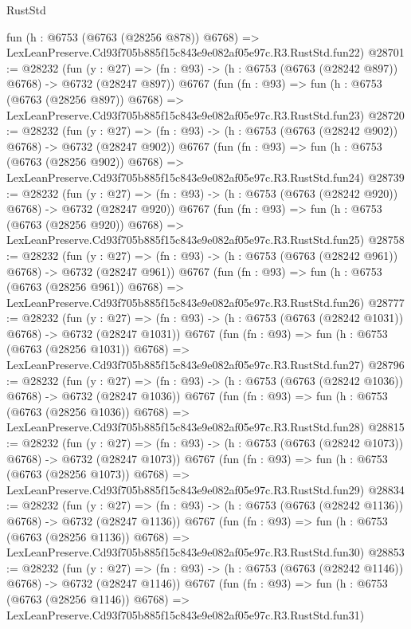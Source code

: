 \begin{lexlean}{RustStd}
\begin{coremodule}
    fun (h : @6753 (@6763 (@28256 @878)) @6768) =>
    LexLeanPreserve.Cd93f705b885f15c843e9e082af05e97c.R3.RustStd.fun22)
@28701 := @28232
    (fun (y : @27) => (fn : @93) -> (h : @6753 (@6763 (@28242 @897)) @6768) -> @6732 (@28247 @897))
    @6767
    (fun (fn : @93) =>
    fun (h : @6753 (@6763 (@28256 @897)) @6768) =>
    LexLeanPreserve.Cd93f705b885f15c843e9e082af05e97c.R3.RustStd.fun23)
@28720 := @28232
    (fun (y : @27) => (fn : @93) -> (h : @6753 (@6763 (@28242 @902)) @6768) -> @6732 (@28247 @902))
    @6767
    (fun (fn : @93) =>
    fun (h : @6753 (@6763 (@28256 @902)) @6768) =>
    LexLeanPreserve.Cd93f705b885f15c843e9e082af05e97c.R3.RustStd.fun24)
@28739 := @28232
    (fun (y : @27) => (fn : @93) -> (h : @6753 (@6763 (@28242 @920)) @6768) -> @6732 (@28247 @920))
    @6767
    (fun (fn : @93) =>
    fun (h : @6753 (@6763 (@28256 @920)) @6768) =>
    LexLeanPreserve.Cd93f705b885f15c843e9e082af05e97c.R3.RustStd.fun25)
@28758 := @28232
    (fun (y : @27) => (fn : @93) -> (h : @6753 (@6763 (@28242 @961)) @6768) -> @6732 (@28247 @961))
    @6767
    (fun (fn : @93) =>
    fun (h : @6753 (@6763 (@28256 @961)) @6768) =>
    LexLeanPreserve.Cd93f705b885f15c843e9e082af05e97c.R3.RustStd.fun26)
@28777 := @28232
    (fun (y : @27) =>
    (fn : @93) -> (h : @6753 (@6763 (@28242 @1031)) @6768) -> @6732 (@28247 @1031))
    @6767
    (fun (fn : @93) =>
    fun (h : @6753 (@6763 (@28256 @1031)) @6768) =>
    LexLeanPreserve.Cd93f705b885f15c843e9e082af05e97c.R3.RustStd.fun27)
@28796 := @28232
    (fun (y : @27) =>
    (fn : @93) -> (h : @6753 (@6763 (@28242 @1036)) @6768) -> @6732 (@28247 @1036))
    @6767
    (fun (fn : @93) =>
    fun (h : @6753 (@6763 (@28256 @1036)) @6768) =>
    LexLeanPreserve.Cd93f705b885f15c843e9e082af05e97c.R3.RustStd.fun28)
@28815 := @28232
    (fun (y : @27) =>
    (fn : @93) -> (h : @6753 (@6763 (@28242 @1073)) @6768) -> @6732 (@28247 @1073))
    @6767
    (fun (fn : @93) =>
    fun (h : @6753 (@6763 (@28256 @1073)) @6768) =>
    LexLeanPreserve.Cd93f705b885f15c843e9e082af05e97c.R3.RustStd.fun29)
@28834 := @28232
    (fun (y : @27) =>
    (fn : @93) -> (h : @6753 (@6763 (@28242 @1136)) @6768) -> @6732 (@28247 @1136))
    @6767
    (fun (fn : @93) =>
    fun (h : @6753 (@6763 (@28256 @1136)) @6768) =>
    LexLeanPreserve.Cd93f705b885f15c843e9e082af05e97c.R3.RustStd.fun30)
@28853 := @28232
    (fun (y : @27) =>
    (fn : @93) -> (h : @6753 (@6763 (@28242 @1146)) @6768) -> @6732 (@28247 @1146))
    @6767
    (fun (fn : @93) =>
    fun (h : @6753 (@6763 (@28256 @1146)) @6768) =>
    LexLeanPreserve.Cd93f705b885f15c843e9e082af05e97c.R3.RustStd.fun31)

\end{coremodule}
\end{lexlean}
